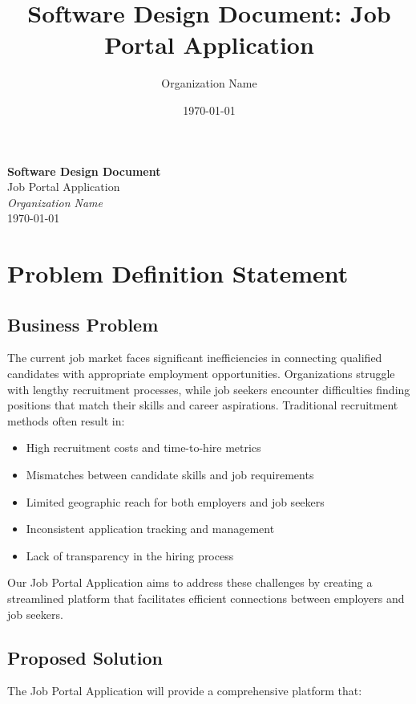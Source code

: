 \documentclass[12pt,a4paper]{article}
\title{Software Design Document: Job Portal Application}
\author{Organization Name}
\date{\today}
\begin{document}
\begin{titlepage}
    \centering
    \vspace*{1cm}
    {\huge\bfseries Software Design Document\\}
    \vspace{1.5cm}
    {\LARGE Job Portal Application\\}
    \vspace{2cm}
    {\Large\itshape Organization Name\\}
    \vfill
    {\large \today\\}
\end{titlepage}

\tableofcontents
\newpage

\section{Problem Definition Statement}

\subsection{Business Problem}
The current job market faces significant inefficiencies in connecting qualified candidates with appropriate employment opportunities. Organizations struggle with lengthy recruitment processes, while job seekers encounter difficulties finding positions that match their skills and career aspirations. Traditional recruitment methods often result in:

\begin{itemize}
    \item High recruitment costs and time-to-hire metrics
    \item Mismatches between candidate skills and job requirements
    \item Limited geographic reach for both employers and job seekers
    \item Inconsistent application tracking and management
    \item Lack of transparency in the hiring process
\end{itemize}

Our Job Portal Application aims to address these challenges by creating a streamlined platform that facilitates efficient connections between employers and job seekers.

\subsection{Proposed Solution}
The Job Portal Application will provide a comprehensive platform that:
\end{document}
